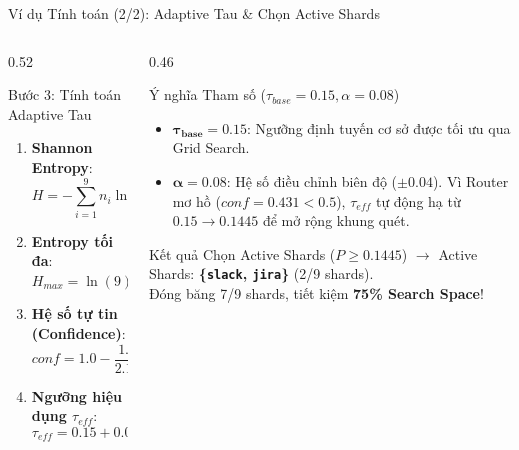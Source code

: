 \documentclass[aspectratio=169,10pt]{beamer}
\begin{document}
\begin{frame}{Ví dụ Tính toán (2/2): Adaptive Tau \& Chọn Active Shards}
\small
\begin{columns}[T]
\begin{column}{0.52\textwidth}
\begin{alertblock}{Bước 3: Tính toán Adaptive Tau}
\begin{enumerate}
    \item \textbf{Shannon Entropy}:
    $$H = -\sum_{i=1}^9 n_i \ln n_i \approx \mathbf{1.25}$$
    \item \textbf{Entropy tối đa}: $H_{max} = \ln(9) \approx \mathbf{2.197}$
    \item \textbf{Hệ số tự tin (Confidence)}:
    $$conf = 1.0 - \frac{1.25}{2.197} = \mathbf{0.431}$$
    \item \textbf{Ngưỡng hiệu dụng $\tau_{eff}$}:
    $$\tau_{eff} = 0.15 + 0.08 \times (0.431 - 0.5) = \mathbf{0.1445}$$
\end{enumerate}
\end{alertblock}
\end{column}

\begin{column}{0.46\textwidth}
\begin{block}{Ý nghĩa Tham số ($\tau_{base}=0.15, \alpha=0.08$)}
\begin{itemize}
    \item $\mathbf{\tau_{base} = 0.15}$: Ngưỡng định tuyến cơ sở được tối ưu qua Grid Search.
    \item $\mathbf{\alpha = 0.08}$: Hệ số điều chỉnh biên độ ($\pm 0.04$). Vì Router mơ hồ ($conf = 0.431 < 0.5$), $\tau_{eff}$ tự động hạ từ $0.15 \rightarrow 0.1445$ để mở rộng khung quét.
\end{itemize}
\end{block}

\begin{exampleblock}{Kết quả Chọn Active Shards ($P \ge 0.1445$)}
$\rightarrow$ Active Shards: \textbf{\{\texttt{slack}, \texttt{jira}\}} (2/9 shards).\\
Đóng băng 7/9 shards, tiết kiệm \textbf{75\% Search Space}!
\end{exampleblock}
\end{column}
\end{columns}
\end{frame}
\end{document}
